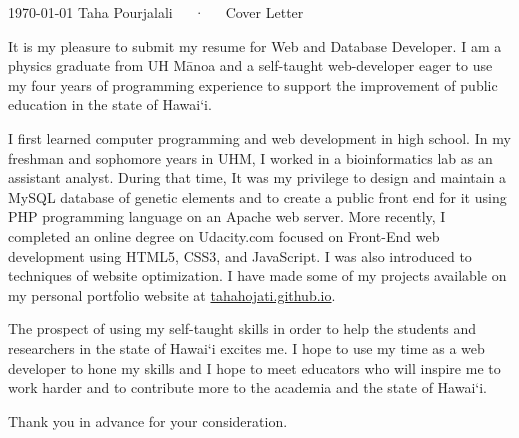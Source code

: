\documentclass[11pt, a4paper]{awesome-cv}
\begin{document}
\makecvheader

\makecvfooter
  {\today}
  {Taha Pourjalali~~~·~~~Cover Letter}
  {}

\makelettertitle

\begin{cvletter}

It is my pleasure to submit my resume for Web and Database Developer. I am a physics graduate from UH Mānoa and
a self-taught web-developer eager to use my four years of programming experience to support the improvement of public education in
the state of Hawai‘i.

I first learned computer programming and web development in high school. In my freshman and sophomore years in
UHM, I worked in a bioinformatics lab as an assistant analyst. During that time, It was my privilege to design and maintain
a MySQL database of genetic elements and to create a public front end for it using PHP programming language on an
Apache web server. More recently, I completed an online degree on Udacity.com focused on Front-End web development
using HTML5, CSS3, and JavaScript. I was also introduced to techniques of website optimization. I have made some of my
projects available on my personal portfolio website at \href{http://tahahojati.github.io}{tahahojati.github.io}.

The prospect of using my self-taught skills in order to help the students and researchers in the state of Hawai‘i excites me.
I hope to use my time as a web developer to hone my skills
and I hope to meet educators who will inspire me to work harder and to contribute more to the academia
and the state of Hawai‘i.

Thank you in advance for your consideration.

\end{cvletter}


\makeletterclosing
\end{document}
